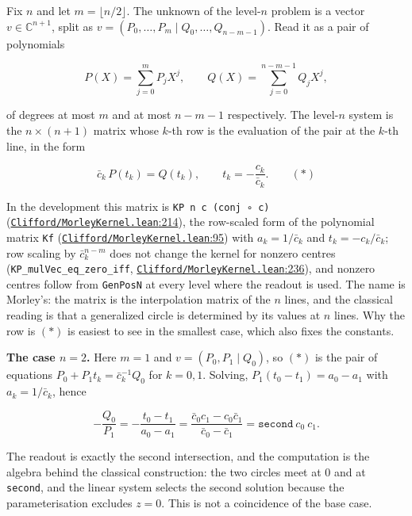 \documentclass[11pt]{article}
\theoremstyle{definition}
\theoremstyle{remark}
\begin{document}
Fix \(n\) and let \(m = \lfloor n/2 \rfloor\). The unknown of the level-\(n\) problem is a vector
\(v \in \mathbb{C}^{n+1}\), split as \(v = (P_0, \dots, P_m \mid Q_0, \dots, Q_{n-m-1})\). Read it as a pair of
polynomials

\[ P(X) = \sum_{j=0}^{m} P_j X^j, \qquad Q(X) = \sum_{j=0}^{n-m-1} Q_j X^j, \]

of degrees at most \(m\) and at most \(n-m-1\) respectively. The level-\(n\) system is the \(n \times (n+1)\)
matrix whose \(k\)-th row is the evaluation of the pair at the \(k\)-th line, in the form

\[ \bar c_k \, P(t_k) = Q(t_k), \qquad t_k = -\frac{c_k}{\bar c_k}. \qquad (\ast) \]

In the development this matrix is \texttt{KP\ n\ c\ (conj\ ∘\ c)} (\href{https://github.com/jpbald93/paperl_clifford_chain/blob/e1ae145c2565cc98816635387412edc0a740c27c/Clifford/MorleyKernel.lean\#L214}{\texttt{Clifford/\allowbreak MorleyKernel.lean}:214}), the row-scaled
form of the polynomial matrix \texttt{Kf} (\href{https://github.com/jpbald93/paperl_clifford_chain/blob/e1ae145c2565cc98816635387412edc0a740c27c/Clifford/MorleyKernel.lean\#L95}{\texttt{Clifford/\allowbreak MorleyKernel.lean}:95}) with \(a_k = 1/\bar c_k\) and
\(t_k = -c_k/\bar c_k\); row scaling by \(\bar c_k^{n - m}\) does not change the kernel for nonzero centres
(\texttt{KP\_\allowbreak mulVec\_\allowbreak eq\_\allowbreak zero\_\allowbreak iff}, \href{https://github.com/jpbald93/paperl_clifford_chain/blob/e1ae145c2565cc98816635387412edc0a740c27c/Clifford/MorleyKernel.lean\#L236}{\texttt{Clifford/\allowbreak MorleyKernel.lean}:236}), and nonzero centres follow from \texttt{GenPosN} at
every level where the readout is used. The name is Morley's: the matrix is the interpolation matrix of the
\(n\) lines, and the classical reading is that a generalized circle is determined by its values at \(n\) lines.
Why the row is \((\ast)\) is easiest to see in the smallest case, which also fixes the constants.

\textbf{The case \(n = 2\).} Here \(m = 1\) and \(v = (P_0, P_1 \mid Q_0)\), so \((\ast)\) is the pair of equations
\(P_0 + P_1 t_k = \bar c_k^{-1} Q_0\) for \(k = 0, 1\). Solving, \(P_1 (t_0 - t_1) = a_0 - a_1\) with
\(a_k = 1/\bar c_k\), hence

\[ -\frac{Q_0}{P_1} = -\frac{t_0 - t_1}{a_0 - a_1} = \frac{\bar c_0 c_1 - c_0 \bar c_1}{\bar c_0 - \bar c_1} = \texttt{second}\ c_0\ c_1 . \]

The readout is exactly the second intersection, and the computation is the algebra behind the classical
construction: the two circles meet at \(0\) and at \texttt{second}, and the linear system selects the second
solution because the parameterisation excludes \(z = 0\). This is not a coincidence of the base case.
\end{document}
